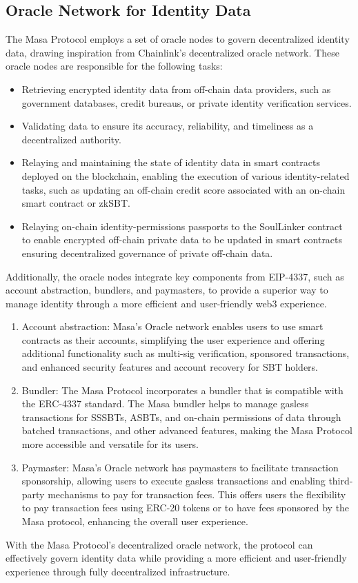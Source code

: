 \documentclass{article}
\begin{document}
\subsection{Oracle Network for Identity Data}
The Masa Protocol employs a set of oracle nodes to govern decentralized identity data, drawing inspiration from Chainlink's\cite{chainlink} decentralized oracle network. These oracle nodes are responsible for the following tasks:
\begin{itemize}
\item Retrieving encrypted identity data from off-chain data providers, such as government databases, credit bureaus, or private identity verification services.
\item Validating data to ensure its accuracy, reliability, and timeliness as a decentralized authority.
\item Relaying and maintaining the state of identity data in smart contracts deployed on the blockchain, enabling the execution of various identity-related tasks, such as updating an off-chain credit score associated with an on-chain smart contract or zkSBT.
\item Relaying on-chain identity-permissions passports to the SoulLinker contract to enable encrypted off-chain private data to be updated in smart contracts ensuring decentralized governance of private off-chain data. 
\end{itemize}
Additionally, the oracle nodes integrate key components from EIP-4337, such as account abstraction, bundlers, and paymasters, to provide a superior way to manage identity through a more efficient and user-friendly web3 experience.
\begin{enumerate}
\item Account abstraction: Masa's Oracle network enables users to use smart contracts as their accounts, simplifying the user experience and offering additional functionality such as multi-sig verification, sponsored transactions, and enhanced security features and account recovery for SBT holders.
\item Bundler: The Masa Protocol incorporates a bundler that is compatible with the ERC-4337 standard. The Masa bundler helps to manage gasless transactions for SSSBTs, ASBTs, and on-chain permissions of data through batched transactions, and other advanced features, making the Masa Protocol more accessible and versatile for its users.
\item Paymaster: Masa's Oracle network has paymasters to facilitate transaction sponsorship, allowing users to execute gasless transactions and enabling third-party mechanisms to pay for transaction fees. This offers users the flexibility to pay transaction fees using ERC-20 tokens or to have fees sponsored by the Masa protocol, enhancing the overall user experience.
\end{enumerate}
With the Masa Protocol's decentralized oracle network, the protocol can effectively govern identity data while providing a more efficient and user-friendly experience through fully decentralized infrastructure.
\end{document}
